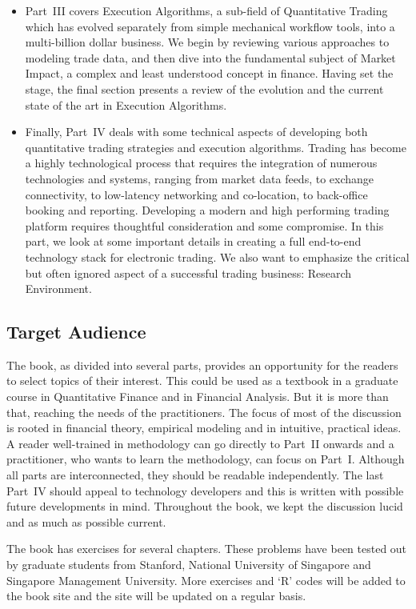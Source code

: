 \begin{itemize}
\item Part~III covers Execution Algorithms, a sub-field of Quantitative Trading which has evolved separately from simple mechanical workflow tools, into a multi-billion dollar business. We begin by reviewing various approaches to modeling trade data, and then dive into the fundamental subject of Market Impact, a complex and least understood concept in finance. Having set the stage, the final section presents a review of the evolution and the current state of the art in Execution Algorithms.

\item Finally, Part~IV deals with some technical aspects of developing both quantitative trading strategies and execution algorithms. Trading has become a highly technological process that requires the integration of numerous technologies and systems,  ranging from market data feeds, to exchange connectivity, to low-latency networking and co-location, to back-office booking and reporting. Developing a modern and high performing trading platform requires thoughtful consideration and some compromise. In this part, we look at some important details in creating a full end-to-end technology stack for electronic trading. We also want to emphasize the critical but often ignored aspect of a successful trading business: Research Environment.
\end{itemize} 


\subsection{Target Audience}

The book, as divided into several parts, provides an opportunity for the readers to select topics of their interest. This could be used as a textbook in a graduate course in Quantitative Finance and in Financial Analysis. But it is more than that, reaching the needs of the practitioners. The focus of most of the discussion is rooted in financial theory, empirical modeling and in intuitive, practical ideas. A reader well-trained in methodology can go directly to Part~II onwards and a practitioner, who wants to learn the methodology, can focus on Part~I. Although all parts are interconnected, they should be readable independently. The last Part~IV should appeal to technology developers and this is written with possible future developments in mind. Throughout the book, we kept the discussion lucid and as much as possible current. 


The book has exercises for several chapters. These problems have been tested out by graduate students from Stanford, National University of Singapore and Singapore Management University. More exercises and `R' codes will be added to the book site and the site will be updated on a regular basis. 